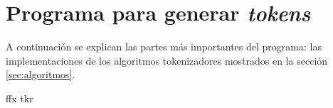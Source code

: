 %
%
%

\section{Programa para generar \textit{tokens}}

A continuación se explican las partes más importantes del programa:
las implementaciones de los algoritmos tokenizadores mostrados en la
sección \ref{sec:algoritmos}.


{ffx}
{tkr}
